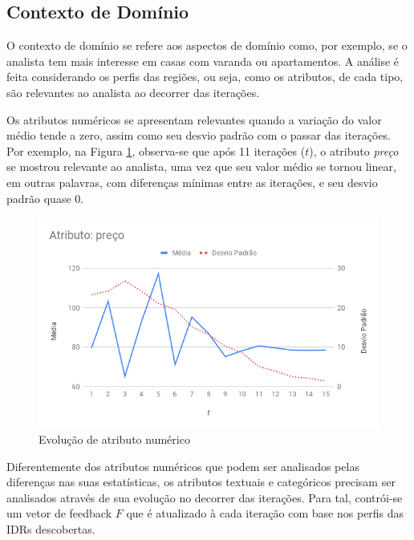 
\subsection{Contexto de Domínio}

O contexto de domínio se refere aos aspectos de domínio como, por exemplo, se o analista tem mais interesse em casas com varanda ou apartamentos. A análise é feita considerando os perfis das regiões, ou seja, como os atributos, de cada tipo, são relevantes ao analista ao decorrer das iterações.


Os atributos numéricos se apresentam relevantes quando a variação do valor médio tende a zero, assim como seu desvio padrão com o passar das iterações. Por exemplo, na Figura \ref{fig:analise-atributo-numerico}, observa-se que após 11 iterações ($t$), o atributo {\em preço} se mostrou relevante ao analista, uma vez que seu valor médio se tornou linear, em outras palavras, com diferenças mínimas entre as iterações, e seu desvio padrão quase 0.

\begin{figure}[!h]
	\centering
	\includegraphics[width=\textwidth]{imagens/analise-atributo-numerico}
	\caption{Evolução de atributo numérico}
	\label{fig:analise-atributo-numerico}
\end{figure}

Diferentemente dos atributos numéricos que podem ser analisados pelas diferenças nas suas estatísticas, os atributos textuais e categóricos precisam ser analisados através de sua evolução no decorrer das iterações. Para tal, contrói-se um vetor de feedback $F$ que é atualizado à cada iteração com base nos perfis das IDRs descobertas.

